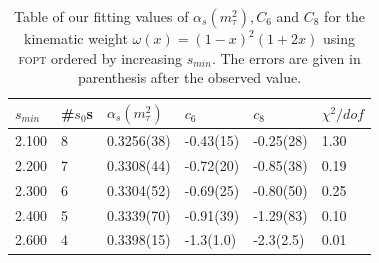 \documentclass[../../index.tex]{subfiles}
\begin{document}
\begin{table}
  \centering
  \begin{tabular}{llllll}
    \toprule
    \(s_{min}\) & \#\(s_0\)s & \(\alpha_s(m_\tau^2)\) & \(c_6\) & \(c_8\) & \(\chi^2/dof\)  \\
    \midrule
    2.100 & 8 & 0.3256(38) & -0.43(15) & -0.25(28) & 1.30 \\
    \rowcolor{primary}
    2.200 & 7 & 0.3308(44) & -0.72(20) & -0.85(38) & 0.19 \\
    \rowcolor{primary}
    2.300 & 6 & 0.3304(52) & -0.69(25) & -0.80(50) & 0.25 \\
    \rowcolor{primary}
    2.400 & 5 & 0.3339(70) & -0.91(39) & -1.29(83) & 0.10 \\
    2.600 & 4 & 0.3398(15) & -1.3(1.0) & -2.3(2.5) & 0.01  \\
    \bottomrule
  \end{tabular}
  \caption{Table of our fitting values of \(\alpha_s(m_\tau^2), C_6\) and
    \(C_8\) for the kinematic weight \(\omega(x)=(1-x)^2(1+2x)\) using
    \textsc{fopt} ordered by increasing \(s_{min}\). The errors are given in
    parenthesis after the observed value.}
  \label{table:fitWKinAlD6D8}
\end{table}
\end{document}
